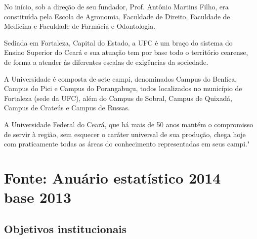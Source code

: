 \documentclass{report}
\begin{document}
No início, sob a direção de seu fundador, Prof. Antônio Martins Filho, era constituída pela Escola de Agronomia, Faculdade de Direito, Faculdade de Medicina e Faculdade de Farmácia e Odontologia.

Sediada em Fortaleza, Capital do Estado, a UFC é um braço do sistema do Ensino Superior do Ceará e sua atuação tem por base todo o território cearense, de forma a atender às diferentes escalas de exigências da sociedade.

A Universidade é composta de sete campi, denominados Campus do Benfica, Campus do Pici e Campus do Porangabuçu, todos localizados no município de Fortaleza (sede da UFC), além do Campus de Sobral, Campus de Quixadá, Campus de Crateús e Campus de Russas.

A Universidade Federal do Ceará, que há mais de 50 anos mantém o compromisso de servir à região, sem esquecer o caráter universal de sua produção, chega hoje com praticamente todas as áreas do conhecimento representadas em seus campi." 

\section{Fonte: Anuário estatístico 2014 base 2013}

\cite{anuario_2014_base_2013}

\subsection{Objetivos institucionais}
\end{document}
